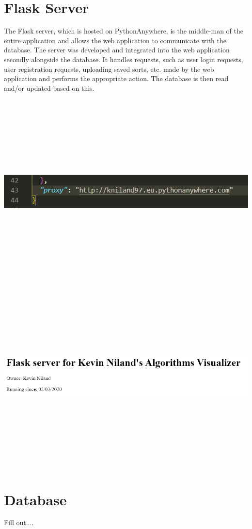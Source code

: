 \section{Flask Server}
The Flask server, which is hosted on PythonAnywhere, is the middle-man of the entire application and allows the web application to communicate with the database. The server was developed and integrated into the web application secondly alongside the database. It handles requests, such as user login requests, user registration requests, uploading saved sorts, etc. made by the web application and performs the appropriate action. The database is then read and/or updated based on this. 

\begin{center}
    \includegraphics[width=15cm,height=10cm,keepaspectratio]{images/proxy}
    \includegraphics[width=15cm,height=10cm,keepaspectratio]{images/pa_kn}
\end{center}

\section{Database}
Fill out....